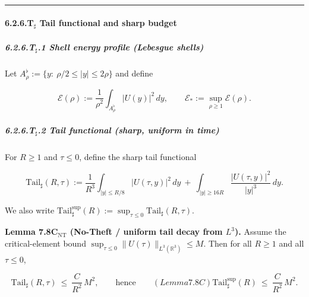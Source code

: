 \documentclass[
  11pt,
]{article}
\begin{document}
\begin{center}\rule{0.5\linewidth}{0.5pt}\end{center}

\hypertarget{t_sharp-tail-functional-and-sharp-budget}{%
\paragraph{\texorpdfstring{6.2.6.T\(_\sharp\) Tail functional and sharp budget}{6.2.6.T\_\textbackslash sharp Tail functional and sharp budget}}\label{t_sharp-tail-functional-and-sharp-budget}}

\hypertarget{t_sharp.1-shell-energy-profile-lebesgue-shells}{%
\subparagraph{\texorpdfstring{6.2.6.T\(_\sharp\).1 Shell energy profile (Lebesgue shells)}{6.2.6.T\_\textbackslash sharp.1 Shell energy profile (Lebesgue shells)}}\label{t_sharp.1-shell-energy-profile-lebesgue-shells}}

Let \(A_\rho^{\flat}:=\{y:\ \rho/2\le |y|\le 2\rho\}\) and define

\begin{equation}
\mathcal{E}(\rho):=\frac{1}{\rho^2}\int_{A_\rho^{\flat}}|U(y)|^2\,dy,\qquad
\mathcal{E}_*:=\sup_{\rho\ge 1}\mathcal{E}(\rho).
\tag{7.TE}\label{eq:7T_shell_energy}
\end{equation}

\hypertarget{t_sharp.2-tail-functional-sharp-uniform-in-time}{%
\subparagraph{\texorpdfstring{6.2.6.T\(_\sharp\).2 Tail functional (sharp, uniform in time)}{6.2.6.T\_\textbackslash sharp.2 Tail functional (sharp, uniform in time)}}\label{t_sharp.2-tail-functional-sharp-uniform-in-time}}

For \(R\ge1\) and \(\tau\le 0\), define the sharp tail functional

\begin{equation}
\mathrm{Tail}_\sharp(R,\tau)
:=
\frac{1}{R^3}\int_{|y|\le R/8}|U(\tau,y)|^2\,dy
\ +\
\int_{|y|\ge 16R}\frac{|U(\tau,y)|^2}{|y|^3}\,dy.
\tag{7.T\sharp}\label{eq:7T_tail_sharp_def}
\end{equation}

We also write \(\mathrm{Tail}_\sharp^{\sup}(R):=\sup_{\tau\le 0}\mathrm{Tail}_\sharp(R,\tau)\).

\textbf{Lemma 7.8C\(_{\mathrm{NT}}\) (No-Theft / uniform tail decay from \(L^3\)).} Assume the critical-element bound \(\sup_{\tau\le0}\|U(\tau)\|_{L^3(\mathbb R^3)}\le M\). Then for all \(R\ge1\) and all \(\tau\le0\),

\begin{equation}
\mathrm{Tail}_\sharp(R,\tau)\ \le\ \frac{C}{R^2}\,M^2,
\qquad\text{hence}\qquad (Lemma 7.8C)
\mathrm{Tail}_\sharp^{\sup}(R)\ \le\ \frac{C}{R^2}\,M^2.
\tag{7.TBNT}\label{eq:7T_tail_sharp_no_theft}
\end{equation}
\end{document}
